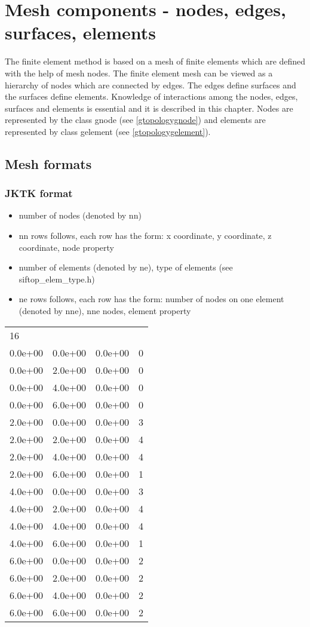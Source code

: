 \chapter{Mesh components - nodes, edges, surfaces, elements}

The finite element method is based on a mesh of finite elements
which are defined with the help of mesh nodes. The finite element
mesh can be viewed as a hierarchy of nodes which are connected
by edges. The edges define surfaces and the surfaces define elements.
Knowledge of interactions among the nodes, edges, surfaces and elements
is essential and it is described in this chapter. Nodes are represented
by the class gnode (see \ref{gtopologygnode}) and elements are represented by
class gelement (see \ref{gtopologygelement}).


\section{Mesh formats}
\subsection{JKTK format}

\begin{itemize}
\item
number of nodes (denoted by nn)
\item
nn rows follows, each row has the form:
x coordinate, y coordinate, z coordinate, node property
\item
number of elements (denoted by ne), type of elements (see siftop\_elem\_type.h)
\item
ne rows follows, each row has the form:
number of nodes on one element (denoted by nne), nne nodes, element property
\end{itemize}

\begin{tabular}{llll}
16      &         &         &
\\
0.0e+00 & 0.0e+00 & 0.0e+00 & 0 
\\
0.0e+00 & 2.0e+00 & 0.0e+00 & 0 
\\
0.0e+00 & 4.0e+00 & 0.0e+00 & 0 
\\
0.0e+00 & 6.0e+00 & 0.0e+00 & 0 
\\
2.0e+00 & 0.0e+00 & 0.0e+00 & 3 
\\
2.0e+00 & 2.0e+00 & 0.0e+00 & 4 
\\
2.0e+00 & 4.0e+00 & 0.0e+00 & 4 
\\
2.0e+00 & 6.0e+00 & 0.0e+00 & 1 
\\
4.0e+00 & 0.0e+00 & 0.0e+00 & 3 
\\
4.0e+00 & 2.0e+00 & 0.0e+00 & 4 
\\
4.0e+00 & 4.0e+00 & 0.0e+00 & 4 
\\
4.0e+00 & 6.0e+00 & 0.0e+00 & 1 
\\
6.0e+00 & 0.0e+00 & 0.0e+00 & 2 
\\
6.0e+00 & 2.0e+00 & 0.0e+00 & 2 
\\
6.0e+00 & 4.0e+00 & 0.0e+00 & 2 
\\
6.0e+00 & 6.0e+00 & 0.0e+00 & 2 
\\
\end{tabular}

